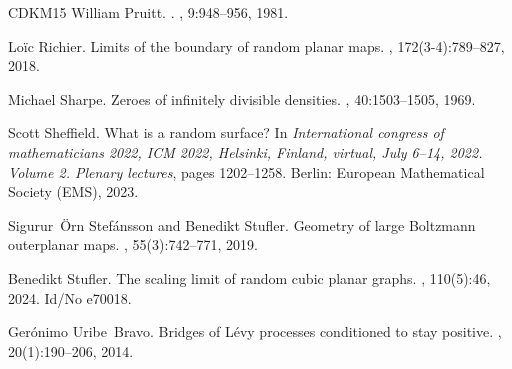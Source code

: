 \documentclass[british, a4paper,11pt]{article}
\numberwithin{equation}{section}
\theoremstyle{definition}
\begin{document}
{\begin{thebibliography}{CDKM15}
William Pruitt.
.
, 9:948--956, 1981.

Lo\"{i}c Richier.
\newblock Limits of the boundary of random planar maps.
, 172(3-4):789--827, 2018.

Michael Sharpe.
\newblock Zeroes of infinitely divisible densities.
, 40:1503--1505, 1969.

Scott Sheffield.
\newblock What is a random surface?
\newblock In {\em International congress of mathematicians 2022, ICM 2022,
  Helsinki, Finland, virtual, July 6--14, 2022. Volume 2. Plenary lectures},
  pages 1202--1258. Berlin: European Mathematical Society (EMS), 2023.

Sigur{\dh}ur~\"{O}rn Stef\'{a}nsson and Benedikt Stufler.
\newblock Geometry of large {Boltzmann} outerplanar maps.
, 55(3):742--771, 2019.

Benedikt Stufler.
\newblock The scaling limit of random cubic planar graphs.
, 110(5):46, 2024.
\newblock Id/No e70018.

Ger\'onimo Uribe~Bravo.
\newblock Bridges of {L}\'evy processes conditioned to stay positive.
, 20(1):190--206, 2014.

\end{thebibliography}
}
\end{document}
